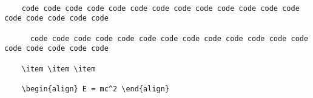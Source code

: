 \documentclass{article}
\begin{document}
\begin{verbatim}

    code code code code code code code code code code code code code code code code code code

      code code code code code code code code code code code code code code code code code code

    \item \item \item

    \begin{align} E = mc^2 \end{align}

\end{verbatim}
\end{document}
